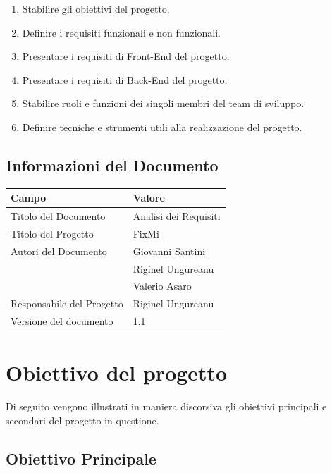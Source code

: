 \documentclass{report}
\begin{document}
\begin{enumerate}
		
	\item Stabilire gli obiettivi del progetto.
	\item Definire i requisiti funzionali e non funzionali.
	\item Presentare i requisiti di Front-End del progetto.
	\item Presentare i requisiti di Back-End del progetto.
	\item Stabilire ruoli e funzioni dei singoli membri del team di sviluppo.
	\item Definire tecniche e strumenti utili alla realizzazione del progetto.

\end{enumerate}


\section{Informazioni del Documento}

\begin{center} %
	\centering
	\begin{tabular}{ |p{4cm}|p{4cm}|  }
		\hline
		\centering Campo & \qquad\qquad Valore \\ %
		\hline
		Titolo del Documento & Analisi dei Requisiti \\
		\hline
		Titolo del Progetto & FixMi \\
		\hline
		Autori del Documento &
		Giovanni Santini \\ & Riginel Ungureanu \\ & Valerio Asaro \\
		\hline
		Responsabile del Progetto & Riginel Ungureanu\\
		\hline
		Versione del documento & 1.1 \\
		\hline
	\end{tabular}
\end{center}


\chapter{Obiettivo del progetto}


Di seguito vengono illustrati in maniera discorsiva gli obiettivi principali e secondari del progetto in questione.

\section{Obiettivo Principale}
\end{document}
